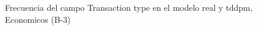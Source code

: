 \begin{figure}[H]
    \centering
    
    \caption{Frecuencia del campo Transaction type en el modelo real y tddpm, Economicos (B-3)}
    \label{frecuency-Transaction Type-tddpm_mlp}
\end{figure}